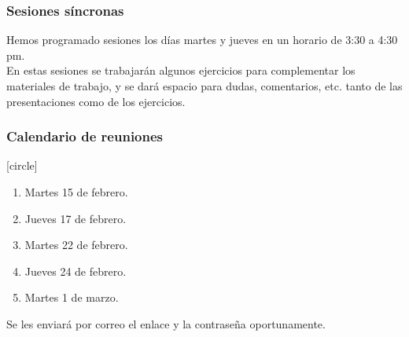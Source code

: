 \documentclass[12pt]{beamer}
\begin{document}
\begin{frame}
\frametitle{Sesiones síncronas}
Hemos programado sesiones los días martes y jueves en un horario de 3:30 a 4:30 pm.
\\
\bigskip
\pause
En estas sesiones se trabajarán algunos ejercicios para complementar los materiales de trabajo, y se dará espacio para dudas, comentarios, etc. tanto de las presentaciones como de los ejercicios.
\end{frame}
\begin{frame}
\frametitle{Calendario de reuniones}
[circle]
\begin{enumerate}[<+->]
\item Martes 15 de febrero.
\item Jueves 17 de febrero.
\item Martes 22 de febrero.
\item Jueves 24 de febrero.
\item Martes 1 de marzo.
\end{enumerate}
\pause
Se les enviará por correo el enlace y la contraseña oportunamente.
\end{frame}
\end{document}
